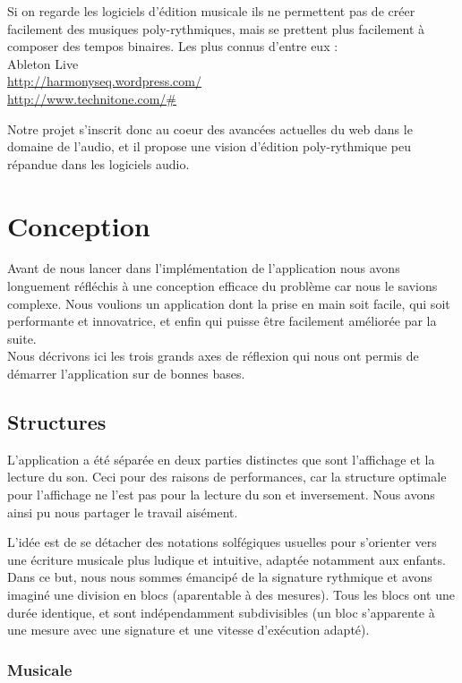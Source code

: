 \documentclass[pdftex,12pt,a4paper]{article}
\begin{document}
Si on regarde les logiciels d'édition musicale ils ne permettent pas de créer facilement des musiques poly-rythmiques, mais se prettent plus facilement à composer des tempos binaires. Les plus connus d'entre eux :\\
Ableton Live\\
\url{http://harmonyseq.wordpress.com/}\\
\url{http://www.technitone.com/#}

\medskip
Notre projet s'inscrit donc au coeur des avancées actuelles du web dans le domaine de l'audio, et il propose une vision d'édition poly-rythmique peu répandue dans les logiciels audio.


\section{Conception}

Avant de nous lancer dans l’implémentation de l’application nous avons longuement réfléchis à une conception efficace du problème car nous le savions complexe. Nous voulions un application dont la prise en main soit facile, qui soit performante et innovatrice, et enfin qui puisse être facilement améliorée par la suite.\\
Nous décrivons ici les trois grands axes de réflexion qui nous ont permis de démarrer l’application sur de bonnes bases.

\subsection{Structures}

L’application a été séparée en deux parties distinctes que sont l’affichage et la lecture du son. Ceci pour des raisons de performances, car la structure optimale pour l’affichage ne l’est pas pour la lecture du son et inversement. Nous avons ainsi pu nous partager le travail aisément.

L'idée est de se détacher des notations solfégiques usuelles pour s'orienter vers une écriture musicale plus ludique et intuitive, adaptée notamment aux enfants. Dans ce but, nous nous sommes émancipé de la signature rythmique et avons imaginé une division en blocs (aparentable à des mesures). Tous les blocs ont une durée identique, et sont indépendamment subdivisibles (un bloc s'apparente à une mesure avec une signature et une vitesse d'exécution adapté).

\subsubsection{Musicale}
\end{document}
